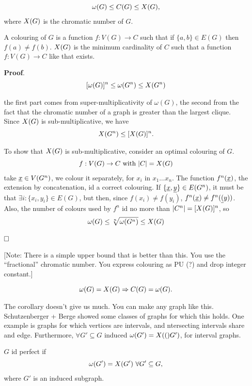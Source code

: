 \begin{prop}
 $$\omega(G) \leq C(G) \leq X(G),$$ where $X(G)$ is the chromatic number of $G$.
\end{prop}

A colouring of $G$ is a function $f: V(G) \rightarrow C$ such that if $\{a, b\} \in E(G)$ then $f(a) \not= f(b)$. $X(G)$ is the minimum cardinality of $C$ such that a function $f: V(G) \rightarrow C$ like that exists.

\noindent\textbf{Proof}. 
\[
 [\omega(G)]^n \leq \omega(G^n) \leq X(G^n)
\]

the first part comes from super-multiplicativity of $\omega(G)$, the second from the fact that the chromatic number of a graph is greater than the largest clique. Since $X(G)$ is sub-multiplicative, we have $$X(G^n) \leq [X(G)]^n.$$

To show that $X(G)$ is sub-multiplicative, consider an optimal colouring of $G$. $$f:V(G) \rightarrow C\ \text{with}\ |C| = X(G)$$ take $\underline{x} \in V(G^n)$, we colour it separately, for $x_i$ in $x_1\ldots x_n$. The function $f^n(\underline{x})$, the extension by concatenation, id a correct colouring. If $\{\underline{x}, \underline{y}\} \in E(G^n)$, it must be that $\exists i : \{x_i, y_i\} \in E(G)$, but then, since $f(x_i) \not=f(y_i)$, $f^n(\underline{x}) \not= f^n(\underline{(}y))$. Also, the number of colours used by $f^n$ id no more than $|C^n| = [X(G)]^n$, so
\[
 \omega(G) \leq \sqrt[n]{\omega(G^n)} \leq X(G)
\]

$\hfill\Box$

[Note: There is a simple upper bound that is better than this. You use the ``fractional'' chromatic number. You express colouring as PU (?) and drop integer constant.]

\begin{cor}
 $$\omega(G) = X(G) \Rightarrow C(G) = \omega(G).$$
\end{cor}

The corollary doesn't give us much. You can make any graph like this. Schutzenberger + Berge showed some classes of graphs for which this holds. One example is graphs for which vertices are intervals, and ntersecting intervals share and edge. Furthermore, $\forall G' \subseteq G$ induced $\omega(G') = X(()G')$, for interval graphs.

\begin{definition}
 $G$ id perfect if $$\omega(G') = \chrom{G'}\ \forall G' \subseteq G,$$ where $G'$ is an induced subgraph.
\end{definition}

